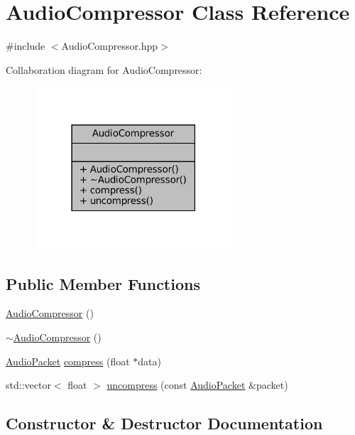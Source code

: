\hypertarget{classAudioCompressor}{}\section{Audio\+Compressor Class Reference}
\label{classAudioCompressor}


{\ttfamily \#include $<$Audio\+Compressor.\+hpp$>$}



Collaboration diagram for Audio\+Compressor\+:
\nopagebreak
\begin{figure}[H]
\begin{center}
\leavevmode
\includegraphics[width=210pt]{classAudioCompressor__coll__graph}
\end{center}
\end{figure}
\subsection*{Public Member Functions}
\begin{DoxyCompactItemize}
\item 
\mbox{\hyperlink{classAudioCompressor_a709c0923fe8284fcebbb391e46344122}{Audio\+Compressor}} ()
\item 
\mbox{\hyperlink{classAudioCompressor_abecbb82629c209698ed0e0a91f7a10bb}{$\sim$\+Audio\+Compressor}} ()
\item 
\mbox{\hyperlink{structAudioPacket}{Audio\+Packet}} \mbox{\hyperlink{classAudioCompressor_af7b96e418c01636321cc865a1c90cba3}{compress}} (float $\ast$data)
\item 
std\+::vector$<$ float $>$ \mbox{\hyperlink{classAudioCompressor_addeadf7ef44fb753925dbfd6e6aaa005}{uncompress}} (const \mbox{\hyperlink{structAudioPacket}{Audio\+Packet}} \&packet)
\end{DoxyCompactItemize}


\subsection{Constructor \& Destructor Documentation}
\mbox{\label{classAudioCompressor_a709c0923fe8284fcebbb391e46344122}} 
